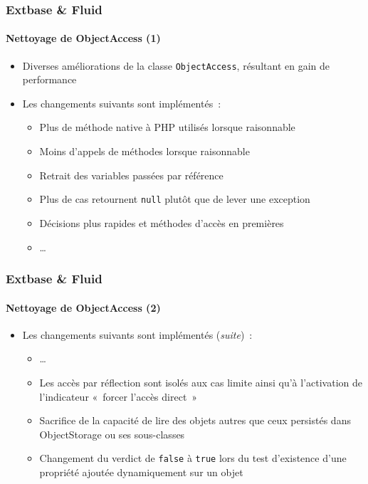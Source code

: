 \begin{frame}[fragile]
	\frametitle{Extbase \& Fluid}
	\framesubtitle{Nettoyage de ObjectAccess (1)}

	\begin{itemize}

		\item Diverses améliorations de la classe \texttt{ObjectAccess}, résultant en gain de performance
		\item Les changements suivants sont implémentés~:

			\begin{itemize}
				\item Plus de méthode native à PHP utilisés lorsque raisonnable
				\item Moins d'appels de méthodes lorsque raisonnable
				\item Retrait des variables passées par référence
				\item Plus de cas retournent \texttt{null} plutôt que de lever une exception
				\item Décisions plus rapides et méthodes d'accès en premières
				\item …
			\end{itemize}

	\end{itemize}

\end{frame}


\begin{frame}[fragile]
	\frametitle{Extbase \& Fluid}
	\framesubtitle{Nettoyage de ObjectAccess (2)}

	\begin{itemize}

		\item Les changements suivants sont implémentés (\textit{suite})~:

			\begin{itemize}
				\item …
				\item Les accès par réflection sont isolés aux cas limite ainsi qu'à l'activation de l'indicateur «~forcer l'accès direct~»
				\item Sacrifice de la capacité de lire des objets autres que ceux persistés dans ObjectStorage ou ses sous-classes
				\item Changement du verdict de \texttt{false} à \texttt{true} lors du test d'existence d'une propriété ajoutée dynamiquement sur un objet
			\end{itemize}

	\end{itemize}

\end{frame}

